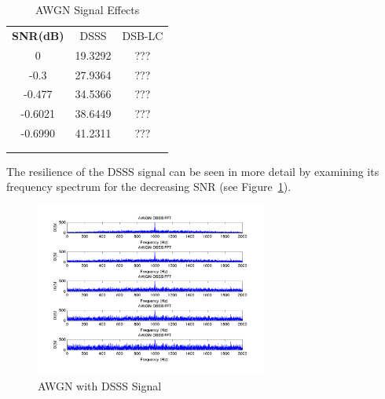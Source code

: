 \documentclass[journal]{IEEEtran}
\begin{document}
\begin{table}[!htpb]
\begin{center}
\begin{tabular}{c | c | c}
  \textbf{SNR(dB)} & DSSS & DSB-LC\\  
  0 & 19.3292 & ???\\
  -0.3 & 27.9364 & ???\\
  -0.477 & 34.5366 & ???\\
  -0.6021 & 38.6449 & ???\\
  -0.6990 & 41.2311 & ???\\
  \\\\
\end{tabular}
\caption{AWGN Signal Effects}
\label{snr}
\end{center}
\end{table}

The resilience of the DSSS signal can be seen in more detail by examining its frequency spectrum for the decreasing SNR (see Figure~\ref{fig:awgn_dsss}). 

\begin{figure}
\centering
\includegraphics[width=3in]{awgn_dsss.png}
\caption{AWGN with DSSS Signal}
\label{fig:awgn_dsss}
\end{figure}
\end{document}
